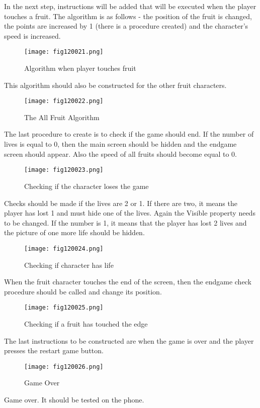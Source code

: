 In the next step, instructions will be added that will be executed when the player touches a fruit. The algorithm is as follows - the position of the fruit is changed, the points are increased by 1 (there is a procedure created) and the character's speed is increased.

\begin{figure}[H]
   \centering
   \texttt{[image: fig120021.png]}
   \caption{Algorithm when player touches fruit}
\label{fig120021}
\end{figure}

This algorithm should also be constructed for the other fruit characters.

\begin{figure}[H]
   \centering
   \texttt{[image: fig120022.png]}
   \caption{The All Fruit Algorithm}
\label{fig120022}
\end{figure}

The last procedure to create is to check if the game should end. If the number of lives is equal to 0, then the main screen should be hidden and the endgame screen should appear. Also the speed of all fruits should become equal to 0.

\begin{figure}[H]
   \centering
   \texttt{[image: fig120023.png]}
   \caption{Checking if the character loses the game}
\label{fig120023}
\end{figure}

Checks should be made if the lives are 2 or 1. If there are two, it means the player has lost 1 and must hide one of the lives. Again the Visible property needs to be changed. If the number is 1, it means that the player has lost 2 lives and the picture of one more life should be hidden.

\begin{figure}[H]
   \centering
   \texttt{[image: fig120024.png]}
   \caption{Checking if character has life}
\label{fig120024}
\end{figure}

When the fruit character touches the end of the screen, then the endgame check procedure should be called and change its position.

\begin{figure}[H]
   \centering
   \texttt{[image: fig120025.png]}
   \caption{Checking if a fruit has touched the edge}
\label{fig120025}
\end{figure}

The last instructions to be constructed are when the game is over and the player presses the restart game button.

\begin{figure}[H]
   \centering
   \texttt{[image: fig120026.png]}
   \caption{Game Over}
\label{fig120026}
\end{figure}

Game over. It should be tested on the phone.
